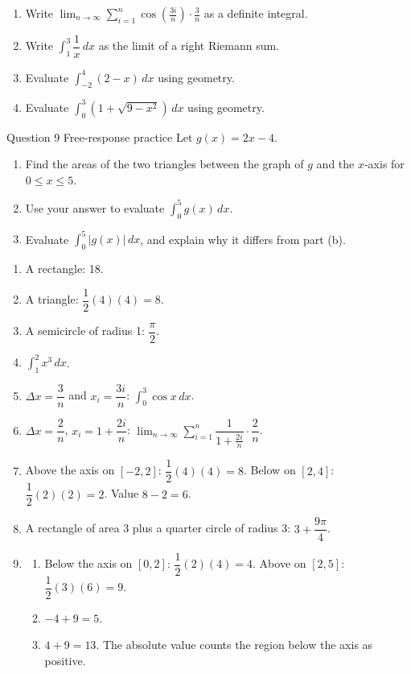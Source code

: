 \documentclass[11pt]{article}
\begin{document}
\begin{enumerate}[leftmargin=*,itemsep=2pt,start=5]
  \item Write $\displaystyle\lim_{n\to\infty}\sum_{i=1}^{n}\cos\!\left(\frac{3i}{n}\right)\cdot\frac{3}{n}$ as a definite integral.\work{2.8cm}
  \item Write $\displaystyle\int_{1}^{3}\dfrac1x\,dx$ as the limit of a right Riemann sum.\work{2.8cm}
  \item Evaluate $\displaystyle\int_{-2}^{4}(2-x)\,dx$ using geometry.\work{2.8cm}
  \item Evaluate $\displaystyle\int_{0}^{3}\left(1+\sqrt{9-x^2}\right)\,dx$ using geometry.\work{2.8cm}
\end{enumerate}

\begin{frbox}{Question 9 \textperiodcentered{} Free-response practice}
Let $g(x)=2x-4$.
\begin{enumerate}[label=(\alph*),leftmargin=*,itemsep=2pt]
  \item Find the areas of the two triangles between the graph of $g$ and the $x$-axis for $0\le x\le5$.\work{2.6cm}
  \item Use your answer to evaluate $\displaystyle\int_{0}^{5}g(x)\,dx$.\work{2.6cm}
  \item Evaluate $\displaystyle\int_{0}^{5}|g(x)|\,dx$, and explain why it differs from part (b).\work{2.6cm}
\end{enumerate}
\end{frbox}

\newpage
\begin{solbox}
\begin{enumerate}[leftmargin=*,itemsep=4pt]
  \item A rectangle: 18.
  \item A triangle: $\dfrac12(4)(4)=8$.
  \item A semicircle of radius 1: $\dfrac\pi2$.
  \item $\displaystyle\int_{1}^{2}x^3\,dx$.
  \item $\Delta x=\dfrac3n$ and $x_i=\dfrac{3i}{n}$: $\displaystyle\int_{0}^{3}\cos x\,dx$.
  \item $\Delta x=\dfrac2n$, $x_i=1+\dfrac{2i}{n}$: $\displaystyle\lim_{n\to\infty}\sum_{i=1}^{n}\dfrac{1}{1+\frac{2i}{n}}\cdot\dfrac2n$.
  \item Above the axis on $[-2,2]$: $\dfrac12(4)(4)=8$. Below on $[2,4]$: $\dfrac12(2)(2)=2$. Value $8-2=6$.
  \item A rectangle of area 3 plus a quarter circle of radius 3: $3+\dfrac{9\pi}{4}$.
  \item \begin{enumerate}[label=(\alph*),leftmargin=*,itemsep=3pt]
    \item Below the axis on $[0,2]$: $\dfrac12(2)(4)=4$. Above on $[2,5]$: $\dfrac12(3)(6)=9$.
    \item $-4+9=5$.
    \item $4+9=13$. The absolute value counts the region below the axis as positive.
  \end{enumerate}
\end{enumerate}
\end{solbox}
\end{document}
